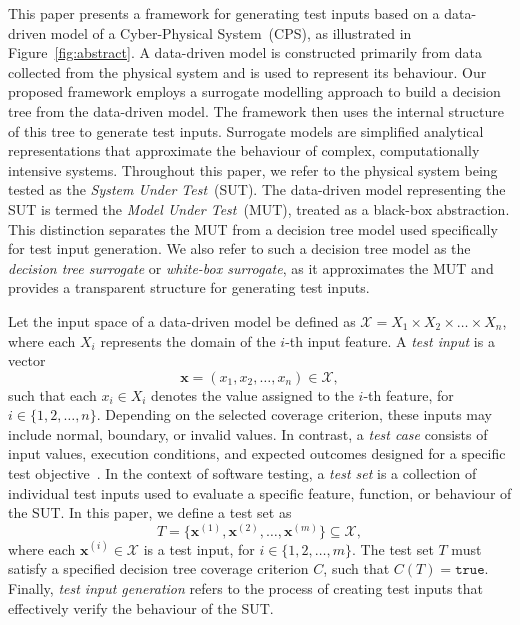\documentclass[
]{ceurart}
\theoremstyle{definition}
\begin{document}
This paper presents a framework for generating test inputs based on a data-driven model of a Cyber-Physical System~(CPS), as illustrated in Figure~\ref{fig:abstract}. A data-driven model is constructed primarily from data collected from the physical system and is used to represent its behaviour. Our proposed framework employs a surrogate modelling approach to build a decision tree from the data-driven model. The framework then uses the internal structure of this tree to generate test inputs. Surrogate models are simplified analytical representations that approximate the behaviour of complex, computationally intensive systems. Throughout this paper, we refer to the physical system being tested as the \textit{System Under Test}~(SUT). The data-driven model representing the SUT is termed the \textit{Model Under Test}~(MUT), treated as a black-box abstraction. This distinction separates the MUT from a decision tree model used specifically for test input generation. We also refer to such a decision tree model as the \textit{decision tree surrogate} or \textit{white-box surrogate}, as it approximates the MUT and provides a transparent structure for generating test inputs.

Let the input space of a data-driven model be defined as $\mathcal{X} = X_1 \times X_2 \times \dots \times X_n$, where each $X_i$ represents the domain of the $i$-th input feature. A \textit{test input} is a vector 
\begin{equation}
\mathbf{x} = (x_1, x_2, \dots, x_n) \in \mathcal{X},
\end{equation}
such that each $x_i \in X_i$ denotes the value assigned to the $i$-th feature, for $i \in \{1, 2, \dots, n\}$. Depending on the selected coverage criterion, these inputs may include normal, boundary, or invalid values. In contrast, a \textit{test case} consists of input values, execution conditions, and expected outcomes designed for a specific test objective~\cite{survey}. In the context of software testing, a \textit{test set} is a collection of individual test inputs used to evaluate a specific feature, function, or behaviour of the SUT. In this paper, we define a test set as
\begin{equation}
T = \{ \mathbf{x}^{(1)}, \mathbf{x}^{(2)}, \dots, \mathbf{x}^{(m)} \} \subseteq \mathcal{X},
\end{equation}
where each $\mathbf{x}^{(i)} \in \mathcal{X}$ is a test input, for $i \in \{1, 2, \dots, m\}$. The test set $T$ must satisfy a specified decision tree coverage criterion $C$, such that $C(T) = \texttt{true}$. Finally, \textit{test input generation} refers to the process of creating test inputs that effectively verify the behaviour of the SUT. 
\end{document}
